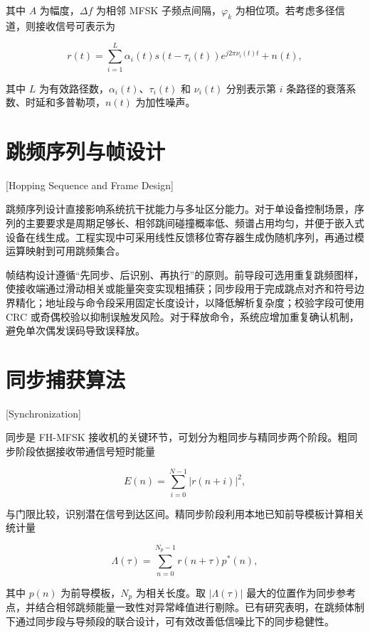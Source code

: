 其中 $A$ 为幅度，$\Delta f$ 为相邻 MFSK 子频点间隔，$\varphi_k$ 为相位项。若考虑多径信道，则接收信号可表示为

\begin{equation}
  r(t)=\sum_{i=1}^{L} \alpha_i(t)s\left(t-\tau_i(t)\right)e^{j2\pi \nu_i(t)t}+n(t),
  \label{eq:channel_model}
\end{equation}

其中 $L$ 为有效路径数，$\alpha_i(t)$、$\tau_i(t)$ 和 $\nu_i(t)$ 分别表示第 $i$ 条路径的衰落系数、时延和多普勒项，$n(t)$ 为加性噪声。

\section{跳频序列与帧设计}[Hopping Sequence and Frame Design]

跳频序列设计直接影响系统抗干扰能力与多址区分能力。对于单设备控制场景，序列的主要要求是周期足够长、相邻跳间碰撞概率低、频谱占用均匀，并便于嵌入式设备在线生成\cite{SongDongPoTiaoPinXuLieSheJiYanJiuXianZhuangYuWeiLaiFaZhan2024}。工程实现中可采用线性反馈移位寄存器生成伪随机序列，再通过模运算映射到可用跳频集合。

帧结构设计遵循“先同步、后识别、再执行”的原则。前导段可选用重复跳频图样，使接收端通过滑动相关或能量突变实现粗捕获；同步段用于完成跳点对齐和符号边界精化；地址段与命令段采用固定长度设计，以降低解析复杂度；校验字段可使用 CRC 或奇偶校验以抑制误触发风险。对于释放命令，系统应增加重复确认机制，避免单次偶发误码导致误释放。

\section{同步捕获算法}[Synchronization]

同步是 FH-MFSK 接收机的关键环节，可划分为粗同步与精同步两个阶段。粗同步阶段依据接收带通信号短时能量

\begin{equation}
  E(n)=\sum_{i=0}^{N-1} \left|r(n+i)\right|^2,
  \label{eq:energy_det}
\end{equation}

与门限比较，识别潜在信号到达区间。精同步阶段利用本地已知前导模板计算相关统计量

\begin{equation}
  \Lambda(\tau)=\sum_{n=0}^{N_p-1} r(n+\tau) p^{\ast}(n),
  \label{eq:correlation_sync}
\end{equation}

其中 $p(n)$ 为前导模板，$N_p$ 为相关长度。取 $|\Lambda(\tau)|$ 最大的位置作为同步参考点，并结合相邻跳频能量一致性对异常峰值进行剔除。已有研究表明，在跳频体制下通过同步段与导频段的联合设计，可有效改善低信噪比下的同步稳健性\cite{ZhaoXiangWuTiaoPinTongXinTongBuJiShuFaZhanZongShu2018,WangDingTiaoPinTongXinXiTongZhongTongBuJiShuDeYanJiuYuFangZhenFenXi2014}。

